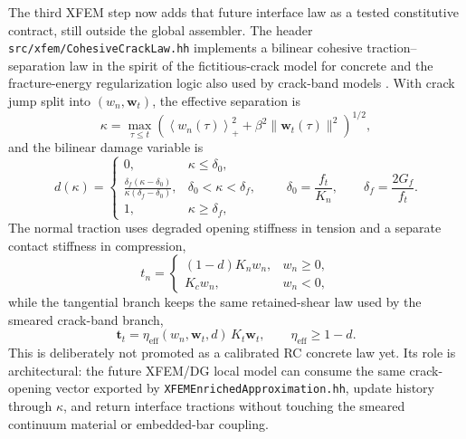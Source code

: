 The third XFEM step now adds that future interface law as a tested constitutive
contract, still outside the global assembler.  The header
\texttt{src/xfem/CohesiveCrackLaw.hh} implements a bilinear cohesive
traction--separation law in the spirit of the fictitious-crack model for
concrete \cite{HillerborgModeerPetersson1976} and the fracture-energy
regularization logic also used by crack-band models
\cite{BazantOh1983CrackBand}.  With crack jump split into
\((w_n,\mathbf{w}_t)\), the effective separation is
\[
  \kappa =
  \max_{\tau\le t}
  \left(
  \left\langle w_n(\tau)\right\rangle_+^2+
  \beta^2\|\mathbf{w}_t(\tau)\|^2
  \right)^{1/2},
\]
and the bilinear damage variable is
\[
  d(\kappa)=
  \begin{cases}
    0, & \kappa\le \delta_0,\\[2mm]
    \displaystyle
    \frac{\delta_f(\kappa-\delta_0)}
         {\kappa(\delta_f-\delta_0)}, &
    \delta_0 < \kappa < \delta_f,\\[3mm]
    1, & \kappa\ge\delta_f,
  \end{cases}
  \qquad
  \delta_0=\frac{f_t}{K_n},\qquad
  \delta_f=\frac{2G_f}{f_t}.
\]
The normal traction uses degraded opening stiffness in tension and a separate
contact stiffness in compression,
\[
  t_n =
  \begin{cases}
    (1-d)K_n w_n, & w_n\ge 0,\\
    K_c w_n, & w_n < 0,
  \end{cases}
\]
while the tangential branch keeps the same retained-shear law used by the
smeared crack-band branch,
\[
  \mathbf{t}_t =
  \eta_{\mathrm{eff}}(w_n,\mathbf{w}_t,d)\,K_t\mathbf{w}_t,\qquad
  \eta_{\mathrm{eff}}\ge 1-d .
\]
This is deliberately not promoted as a calibrated RC concrete law yet.  Its
role is architectural: the future XFEM/DG local model can consume the same
crack-opening vector exported by \texttt{XFEMEnrichedApproximation.hh}, update
history through \(\kappa\), and return interface tractions without touching the
smeared continuum material or embedded-bar coupling.

